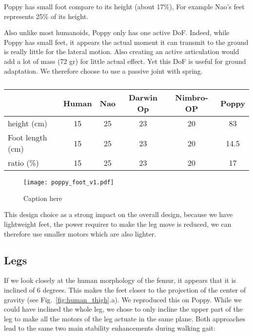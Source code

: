 Poppy has small foot compare to its height (about 17\%), For example Nao's feet represents 25\% of its height.

Also unlike most humanoids, Poppy only has one active DoF. Indeed, while Poppy has small feet, it appears the actual moment it can transmit to the ground is really little for the lateral motion. Also creating an active articulation would add a lot of mass (72 gr) for little actual effect. Yet this DoF is useful for ground adaptation. We therefore choose to use a passive joint with spring.

\begin{table}[h]
\centering
\begin{tabular}{l| c c c c c}
    & Human & Nao & Darwin Op & Nimbro-OP & Poppy \\
    \hline
    height (cm) & 15 & 25 & 23 & 20 & 83\\
    Foot length (cm) & 15 & 25 & 23 & 20 & 14.5\\
    ratio (\%) & 15 & 25 & 23 & 20 & 17\\
\end{tabular}
\caption{}
\label{tab:poppy_feet_compare}
\end{table}


\begin{figure}[tb]
    \begin{center}
        \texttt{[image: poppy\_foot\_v1.pdf]}
    \end{center}
    \caption{Caption here}
    \label{fig:poppy-foot-v1-design}
\end{figure}


This design choice as a strong impact on the overall design, because we have lightweight feet, the power requirer to make the leg move is reduced, we can therefore use smaller motors which are also lighter.


\subsection{Legs} %



If we look closely at the human morphology of the femur, it appears that it is inclined of 6 degrees. This makes the feet closer to the projection of the center of gravity (see Fig.~\ref{fig:human_thigh}.a). We reproduced this on Poppy. While we could have inclined the whole leg, we chose to only incline the upper part of the leg to make all the motors of the leg actuate in the same plane. Both approaches lead to the same two main stability enhancements during walking gait:



